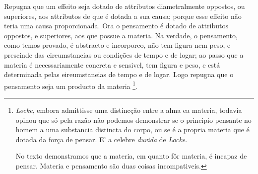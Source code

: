 
Repugna que um effeito seja dotado de attributos diametralmente oppostos, ou superiores, aos attributos de que é dotada a sua causa; porque esse effeito não teria uma causa proporcionada. Ora o pensamento é dotado de attributos oppostos, e superiores, aos que possue a materia. Na verdade, o pensamento, como temos provado, é abstracto e incorporeo, não tem figura nem peso, e prescinde das cireumstancias ou condições de tempo e de logar; ao passo que a materia é necessariamente concreta e sensivel, tem figura e peso, e está determinada pelas eireumstaneias de tempo e de logar. Logo repugna que o pensamento seja um producto da materia \footnote{\emph{Locke}, embora admittisse uma distincção entre a alma ea materia, todavia opinou que só pela razão não podemos demonstrar se o principio pensante no homem a uma substancia distincta do corpo, ou se é a propria materia que é dotada da força de pensar. E' a celebre \emph{duvida} de \emph{Locke}.\par No texto demonstramos que a materia, em quanto fôr materia, é incapaz de pensar. Materia e pensamento são duas coisas incompativeis.}.



